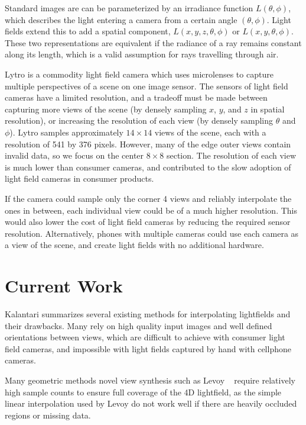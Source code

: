 \documentclass[10pt,twocolumn,letterpaper]{article}
\begin{document}
Standard images are can be parameterized by an irradiance function $L(\theta, \phi)$, which
describes the light entering a camera from a certain angle $(\theta, \phi)$. Light fields
extend this to add a spatial component, $L(x, y, z, \theta, \phi)$ or $L(x, y, \theta, \phi)$. 
These two representations are equivalent if the radiance of a ray remains constant along its length,
which is a valid assumption for rays travelling through air.

Lytro is a commodity light field camera which uses microlenses to capture multiple
perspectives of a scene on one image sensor. The sensors of light field cameras have a 
limited resolution, and a tradeoff must be made between capturing more views of the scene 
(by densely sampling $x$, $y$, and $z$ in spatial resolution), or increasing the resolution of each view 
(by densely sampling $\theta$ and $\phi$). 
Lytro samples approximately $14 \times 14$ views of the scene, each with a resolution of 541 by 376 pixels.
However, many of the edge outer views contain invalid data, so we focus on the center $8 \times 8$ section.
The resolution of each view is much lower than consumer cameras, 
and contributed to the slow adoption of light field cameras in consumer products.

If the camera could sample only the corner 4 views and reliably interpolate the ones in between, each individual view
could be of a much higher resolution. This would also lower the cost of light field cameras by reducing the required
sensor resolution. Alternatively, phones with multiple cameras could use each camera as a 
view of the scene, and create light fields with no additional hardware. 

\section{Current Work}

Kalantari summarizes several existing methods for interpolating lightfields and their drawbacks.
Many rely on high quality input images and well defined orientations between views,
which are difficult to achieve with consumer light field cameras, and impossible with light fields
captured by hand with cellphone cameras.

Many geometric methods novel view synthesis 
such as Levoy \etal~\cite{levoy1996light} require relatively high sample counts to ensure full
coverage of the 4D lightfield, as the simple linear interpolation used by Levoy
do not work well if there are heavily occluded regions or missing data.
\end{document}
